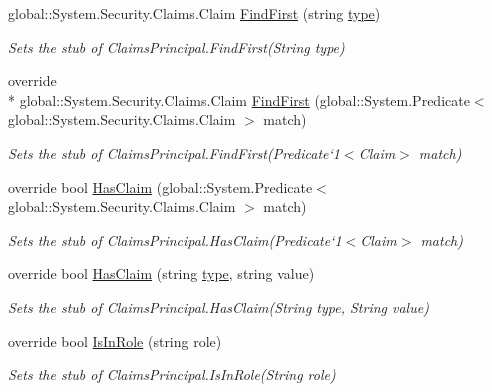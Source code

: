 \begin{DoxyCompactItemize}
global\-::\-System.\-Security.\-Claims.\-Claim \hyperlink{class_system_1_1_security_1_1_claims_1_1_fakes_1_1_stub_claims_principal_a95ea1ce37c5cfb9f4bfd9a992be52068}{Find\-First} (string \hyperlink{jquery-1_810_82-vsdoc_8js_a3940565e83a9bfd10d95ffd27536da91}{type})
\begin{DoxyCompactList}\small\item\em Sets the stub of Claims\-Principal.\-Find\-First(\-String type)\end{DoxyCompactList}\item 
override \\*
global\-::\-System.\-Security.\-Claims.\-Claim \hyperlink{class_system_1_1_security_1_1_claims_1_1_fakes_1_1_stub_claims_principal_a9f9f15dc0d31dffbfd6beb64a3869d55}{Find\-First} (global\-::\-System.\-Predicate$<$ global\-::\-System.\-Security.\-Claims.\-Claim $>$ match)
\begin{DoxyCompactList}\small\item\em Sets the stub of Claims\-Principal.\-Find\-First(Predicate`1$<$Claim$>$ match)\end{DoxyCompactList}\item 
override bool \hyperlink{class_system_1_1_security_1_1_claims_1_1_fakes_1_1_stub_claims_principal_ae611bcc2bb9ba7c43bf80a5dcb60d409}{Has\-Claim} (global\-::\-System.\-Predicate$<$ global\-::\-System.\-Security.\-Claims.\-Claim $>$ match)
\begin{DoxyCompactList}\small\item\em Sets the stub of Claims\-Principal.\-Has\-Claim(Predicate`1$<$Claim$>$ match)\end{DoxyCompactList}\item 
override bool \hyperlink{class_system_1_1_security_1_1_claims_1_1_fakes_1_1_stub_claims_principal_abbc75fca7ed8c87ce9b97eb033d9bb67}{Has\-Claim} (string \hyperlink{jquery-1_810_82-vsdoc_8js_a3940565e83a9bfd10d95ffd27536da91}{type}, string value)
\begin{DoxyCompactList}\small\item\em Sets the stub of Claims\-Principal.\-Has\-Claim(\-String type, String value)\end{DoxyCompactList}\item 
override bool \hyperlink{class_system_1_1_security_1_1_claims_1_1_fakes_1_1_stub_claims_principal_afb9913a1fd4d90890810224b747460c6}{Is\-In\-Role} (string role)
\begin{DoxyCompactList}\small\item\em Sets the stub of Claims\-Principal.\-Is\-In\-Role(\-String role)\end{DoxyCompactList}\end{DoxyCompactItemize}
